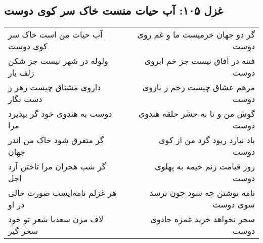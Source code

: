 \begin{center}
\section*{غزل ۱۰۵: آب حیات منست خاک سر کوی دوست}
\label{sec:105}
\begin{longtable}{l p{0.5cm} r}
آب حیات من است خاک سر کوی دوست
&&
گر دو جهان خرمیست ما و غم روی دوست
\\
ولوله در شهر نیست جز شکن زلف یار
&&
فتنه در آفاق نیست جز خم ابروی دوست
\\
داروی مشتاق چیست زهر ز دست نگار
&&
مرهم عشاق چیست زخم ز بازوی دوست
\\
دوست به هندوی خود گر بپذیرد مرا
&&
گوش من و تا به حشر حلقه هندوی دوست
\\
گر متفرق شود خاک من اندر جهان
&&
باد نیارد ربود گرد من از کوی دوست
\\
گر شب هجران مرا تاختن آرد اجل
&&
روز قیامت زنم خیمه به پهلوی دوست
\\
هر غزلم نامه‌ایست صورت حالی در او
&&
نامه نوشتن چه سود چون نرسد سوی دوست
\\
لاف مزن سعدیا شعر تو خود سحر گیر
&&
سحر نخواهد خرید غمزه جادوی دوست
\\
\end{longtable}
\end{center}
